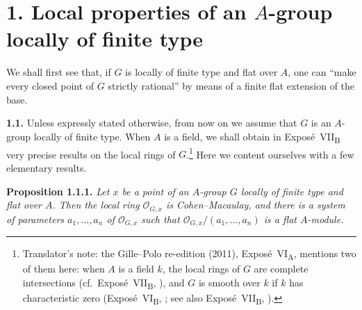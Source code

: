 
\section*{1. Local properties of an \(A\)-group locally of finite type}
\label{sec:sga3-VIA-1}

We shall first see that, if \(G\) is locally of finite type and flat over
\(A\), one can ``make every closed point of \(G\) strictly rational'' by
means of a finite flat extension of the base.

\medskip
{}\label{par:sga3-VIA-1.1}%
\noindent\textbf{1.1.}
Unless expressly stated otherwise, from now on we assume that \(G\) is an
\(A\)-group locally of finite type. When \(A\) is a field, we shall
obtain in Expos\'e~VII\textsubscript{B} very precise results on the local
rings of \(G\).\footnote{Translator's note: the Gille--Polo re-edition (2011),
Exposé~VI\textsubscript{A}, mentions two of them here: when \(A\) is a field \(k\), the local rings of
\(G\) are complete intersections (cf.\ Exposé~VII\textsubscript{B},
), and \(G\) is smooth over \(k\) if \(k\) has characteristic
zero (Exposé~VI\textsubscript{B}, ; see also Exposé~VII\textsubscript{B},
).}
Here we content ourselves with a few elementary results.

\medskip
{}\label{prop:sga3-VIA-1.1.1}%
\noindent\textbf{Proposition 1.1.1.}
\textit{Let \(x\) be a point of an \(A\)-group \(G\) locally of finite type
and flat over \(A\). Then the local ring \(\mathcal O_{G,x}\) is
Cohen--Macaulay, and there is a system of parameters
\(a_1,\ldots,a_n\) of \(\mathcal O_{G,x}\) such that
\(\mathcal O_{G,x}/(a_1,\ldots,a_n)\) is a flat \(A\)-module.}

